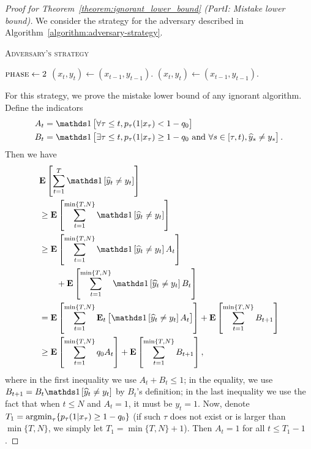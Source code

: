\begin{proof}[Proof for Theorem~\ref{theorem:ignorant_lower_bound} (PartI: Mistake lower bound)]
We consider the strategy for the adversary described in Algorithm~\ref{algorithm:adversary-strategy}.
\begin{algorithm}[h]
\caption{\textsc{Adversary's strategy}}
\label{algorithm:adversary-strategy}
\begin{algorithmic}[1]
{
       \ELSE
          \STATE $\textsc{phase}\leftarrow 2$
       \ENDIF
       \STATE $(x_t, y_t)\leftarrow (x_{t-1}, y_{t-1})$.
    \ENDIF
\ENDFOR
{}
    \STATE $(x_t, y_t)\leftarrow (x_{t-1}, y_{t-1})$.
\ENDFOR


}
\end{algorithmic}
\end{algorithm}
For this strategy, we prove the mistake lower bound of any ignorant algorithm.
Define the indicators
\begin{align*}
A_t &= \indicator{\forall \tau\leq t, p_\tau(1|x_\tau)<1-q_0} \\
B_t &= \indicator{\exists \tau\leq t, p_\tau(1|x_\tau)\geq 1-q_0
 \text{\ and\ } \forall s\in[\tau,t), \widehat y_s \neq y_s}.
\end{align*}
Then we have
\begin{align}
& \mathbf{E}\left[\sum_{t=1}^{T} \indicator{\widehat y_t\neq y_t}\right] \nonumber \\
& \ge \mathbf{E}\left[\sum_{t=1}^{\min\{T,N\}} \indicator{\widehat y_t\neq y_t}\right] \nonumber \\
& \ge \mathbf{E}\left[\sum_{t=1}^{\min\{T,N\}} \indicator{\widehat y_t\neq y_t}A_t\right] \nonumber \\
& \qquad + \mathbf{E}\left[\sum_{t=1}^{\min\{T,N\}} \indicator{\widehat y_t\neq y_t}B_t\right] \nonumber \\
& = \mathbf{E}\left[\sum_{t=1}^{\min\{T,N\}} \mathbf{E}_t\left[\indicator{\widehat y_t\neq y_t}A_t\right]\right] + \mathbf{E}\left[\sum_{t=1}^{\min\{T,N\}} B_{t+1}\right] \nonumber \\
& \ge \mathbf{E}\left[\sum_{t=1}^{\min\{T,N\}} q_0 A_t\right] + \mathbf{E}\left[\sum_{t=1}^{\min\{T,N\}} B_{t+1}\right],
\label{eqn:mistake_lower_bound_temp}
\end{align}
where in the first inequality we use $A_t+B_t\leq 1$; in the equality, we use
$B_{t+1}=B_t\indicator{\widehat y_t\neq y_t}$ by $B_t$'s definition; in the last
inequality we use the fact that when $t\leq N$ and $A_t=1$, it must be $y_t=1$.
Now, denote $T_1 = \operatorname*{argmin}_{\tau} \{ p_\tau(1|x_\tau) \ge 1-q_0 \}$ (if such
$\tau$ does not exist or is larger than $\min\{T,N\}$, we simply let
$T_1=\min\{T,N\}+1$). Then $A_t=1$ for all $t\leq T_1-1$.


\end{proof}
